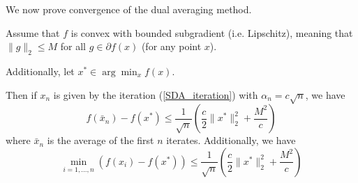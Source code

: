 We now prove convergence of the dual averaging method.
\begin{theorem}\label{SDA_convergence_thm}
 Assume that $f$ is convex with bounded subgradient (i.e. Lipschitz), meaning that $\|g\|_2 \leq M$ for all $g\in \partial f(x)$ (for any point $x$).
 
 Additionally, let $x^*\in \arg\min_x f(x)$.
 
 Then if $x_n$ is given by the iteration (\ref{SDA_iteration}) with $\alpha_n = c\sqrt{n}$, we have
 \begin{equation}
  f(\bar{x}_n) - f(x^*) \leq \frac{1}{\sqrt{n}}\left(\frac{c}{2}\|x^*\|_2^2 + \frac{M^2}{c}\right)
 \end{equation}
 where $\bar{x}_n$ is the average of the first $n$ iterates. Additionally, we have
 \begin{equation}
  \min_{i = 1,...,n} (f(x_i) - f(x^*)) \leq \frac{1}{\sqrt{n}}\left(\frac{c}{2}\|x^*\|_2^2 + \frac{M^2}{c}\right)
 \end{equation}
\end{theorem}

